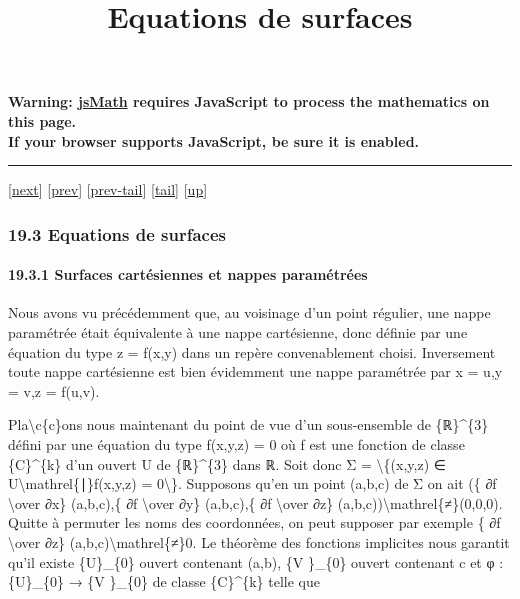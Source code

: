 \documentclass[]{article}
\title{Equations de surfaces}
\author{}
\date{}
\begin{document}
\maketitle

\textbf{Warning: \href{http://www.math.union.edu/locate/jsMath}{jsMath}
requires JavaScript to process the mathematics on this page.\\ If your
browser supports JavaScript, be sure it is enabled.}

\begin{center}\rule{3in}{0.4pt}\end{center}

{[}\href{coursse103.html}{next}{]} {[}\href{coursse101.html}{prev}{]}
{[}\href{coursse101.html\#tailcoursse101.html}{prev-tail}{]}
{[}\hyperref[tailcoursse102.html]{tail}{]}
{[}\href{coursch20.html\#coursse102.html}{up}{]}

\subsubsection{19.3 Equations de surfaces}

\paragraph{19.3.1 Surfaces cartésiennes et nappes paramétrées}

Nous avons vu précédemment que, au voisinage d'un point régulier, une
nappe paramétrée était équivalente à une nappe cartésienne, donc définie
par une équation du type z = f(x,y) dans un repère convenablement
choisi. Inversement toute nappe cartésienne est bien évidemment une
nappe paramétrée par x = u,y = v,z = f(u,v).

Pla\textbackslash{}c\{c\}ons nous maintenant du point de vue d'un
sous-ensemble de \{ℝ\}\^{}\{3\} défini par une équation du type f(x,y,z)
= 0 où f est une fonction de classe \{C\}\^{}\{k\} d'un ouvert U de
\{ℝ\}\^{}\{3\} dans ℝ. Soit donc Σ = \textbackslash{}\{(x,y,z) ∈
U\textbackslash{}mathrel\{∣\}f(x,y,z) = 0\textbackslash{}\}. Supposons
qu'en un point (a,b,c) de Σ on ait (\{ ∂f \textbackslash{}over ∂x\}
(a,b,c),\{ ∂f \textbackslash{}over ∂y\} (a,b,c),\{ ∂f
\textbackslash{}over ∂z\} (a,b,c))\textbackslash{}mathrel\{≠\}(0,0,0).
Quitte à permuter les noms des coordonnées, on peut supposer par exemple
\{ ∂f \textbackslash{}over ∂z\} (a,b,c)\textbackslash{}mathrel\{≠\}0. Le
théorème des fonctions implicites nous garantit qu'il existe
\{U\}\_\{0\} ouvert contenant (a,b), \{V \}\_\{0\} ouvert contenant c et
φ : \{U\}\_\{0\} → \{V \}\_\{0\} de classe \{C\}\^{}\{k\} telle que
\end{document}
